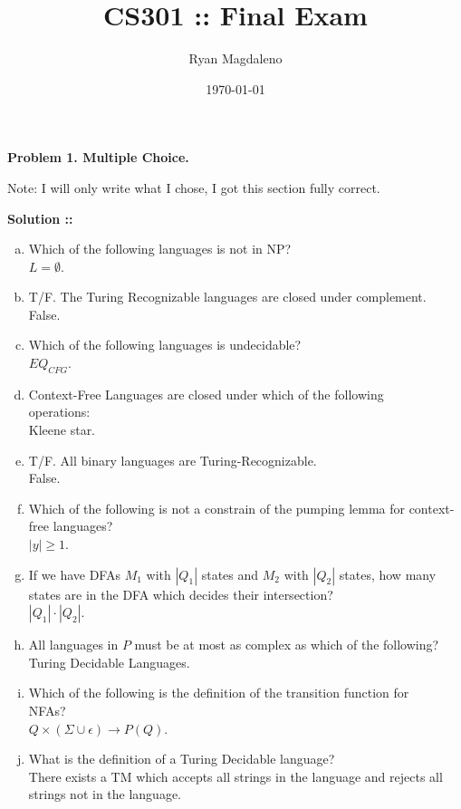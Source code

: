 \documentclass[11pt]{article}
\date{\today}
\title{CS301 :: Final Exam}
\author{Ryan Magdaleno}
\begin{document}
\maketitle


\textbf{Problem 1. Multiple Choice.} 

Note: I will only write what I chose, I got this section fully correct.

\vspace{5px}\textbf{Solution ::}
\begin{enumerate}[a.]
    \item Which of the following languages is not in NP? \\ $L=\emptyset$.
    \item T/F. The Turing Recognizable languages are closed under complement. \\ False.
    \item Which of the following languages is undecidable? \\ $EQ_{CFG}$.
    \item Context-Free Languages are closed under which of the following \\
    operations:\\Kleene star.
    \item T/F. All binary languages are Turing-Recognizable.\\ False.
    \item Which of the following is not a constrain of the pumping lemma for
    context-free languages? \\ $|y|\ge 1$.
    \item If we have DFAs $M_1$ with $|Q_1|$ states and $M_2$ with $|Q_2|$ states,
    how many states are in the DFA which decides their intersection?
    \\$|Q_1|\cdot |Q_2|$.
    \item All languages in $P$ must be at most as complex as which of the following?\\
    Turing Decidable Languages.
    \item Which of the following is the definition of the transition function for 
    \\NFAs?\\
    $Q \times (\Sigma\cup\epsilon)\rightarrow P(Q)$.
    \item What is the definition of a Turing Decidable language? \\
    There exists a TM which accepts all strings in the language and rejects all
    strings not in the language.
\end{enumerate}
\pagebreak
\end{document}
